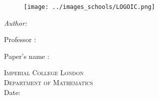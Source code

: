 \begin{titlepage}

\begin{figure}[!htb]
   \begin{minipage}{0.48\textwidth}
	  \texttt{[image: ../images\_schools/LOGOIC.png]} \\[1cm]
   \end{minipage}\hfill
\end{figure}

\begin{flushleft} \large
\vspace*{2 cm}
{\huge \bfseries \reporttitle} 
\vspace*{1.5 cm}

\textit{Author:} \reportauthor
\vspace*{1.5 cm}

{ Professor : \professor }

{Paper's name : \course}
\end{flushleft}

\vspace*{5 cm}
\begin{center}
\textsc{\Large Imperial College London}\\[0.5cm] 
\textsc{\large Department of Mathematics}\\[0.5cm] 
\makeatletter
Date: \@date 
\makeatother


\end{center}

\vfill %






\end{titlepage}